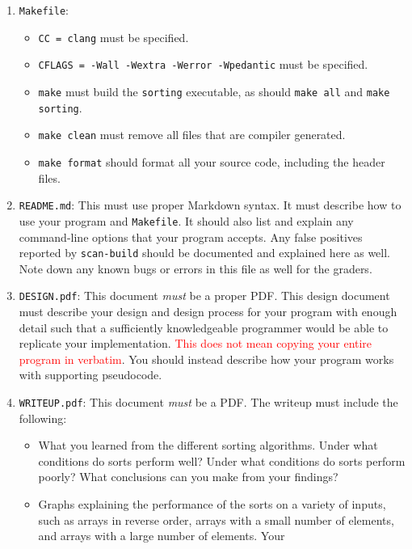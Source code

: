 \begin{enumerate}
  \item \texttt{Makefile}:
    \begin{itemize}
      \item \texttt{CC = clang} must be specified.
      \item \texttt{CFLAGS = -Wall -Wextra -Werror -Wpedantic} must be specified.
      \item \texttt{make} must build the \texttt{sorting}
        executable, as should \texttt{make all} and \texttt{make
        sorting}.
      \item \texttt{make clean} must remove all files that are compiler
        generated.
      \item \texttt{make format} should format all your source code,
        including the header files.
    \end{itemize}
  \item \texttt{README.md}: This must use proper Markdown syntax. It
    must describe how to use your program and \texttt{Makefile}. It
    should also list and explain any command-line options that your
    program accepts. Any false positives reported by \texttt{scan-build}
    should be documented and explained here as well. Note down any known
    bugs or errors in this file as well for the graders.
  \item \texttt{DESIGN.pdf}: This document \emph{must} be a proper
    PDF\@. This design document must describe your design and design
    process for your program with enough detail such that a sufficiently
    knowledgeable programmer would be able to replicate your
    implementation. \textcolor{red}{This does not mean copying your
    entire program in verbatim}. You should instead describe how your
    program works with supporting pseudocode.
  \item \texttt{WRITEUP.pdf}: This document \emph{must} be a PDF. The
    writeup must include the following:
    \begin{itemize}
      \item What you learned from the different sorting algorithms.
        Under what conditions do sorts perform well? Under what
        conditions do sorts perform poorly? What conclusions can you
        make from your findings?
      \item Graphs explaining the performance of the sorts on a variety
        of inputs, such as arrays in reverse order, arrays with a small
        number of elements, and arrays with a large number of elements. Your

\end{itemize}
\end{enumerate}
